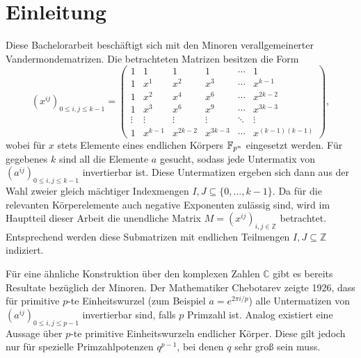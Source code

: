 \section{Einleitung}

Diese Bachelorarbeit beschäftigt sich mit den Minoren verallgemeinerter Vandermondematrizen. Die betrachteten Matrizen besitzen die Form \begin{equation*}
    \left( x^{ij} \right)_{0\leq i,j \leq k-1} = \begin{pmatrix}
        1     & 1    & 1    & 1    &\cdots& 1 \\
        1     & x^1  & x^2  & x^3  &\cdots& x^{k-1} \\
        1     & x^2  & x^4  & x^6  &\cdots& x^{2k-2} \\
        1     & x^3  & x^6  & x^9  &\cdots& x^{3k-3} \\
        \vdots&\vdots&\vdots&\vdots&\ddots&\vdots \\
        1     &x^{k-1}&x^{2k-2}&x^{3k-3}&\cdots&x^{(k-1)(k-1)}
    \end{pmatrix},
\end{equation*}
wobei für $x$ stets Elemente eines endlichen Körpers $\field{p}[n]$ eingesetzt werden. Für gegebenes $k$ sind all die Elemente $a$ gesucht, sodass jede Untermatix von $\left( a^{ij} \right)_{0\leq i,j \leq k-1}$ invertierbar ist. 
Diese Untermatizen ergeben sich dann aus der Wahl zweier gleich mächtiger Indexmengen $I,J \subseteq \{0, \dots, k-1\}$. Da für die relevanten Körperelemente auch negative Exponenten zulässig sind, wird im Hauptteil dieser Arbeit die unendliche Matrix $M = \left( x^{ij} \right)_{i,j \in \mathbb{Z}}$ betrachtet. Entsprechend werden diese Submatrizen mit endlichen Teilmengen $I,J \subseteq \mathbb{Z}$ indiziert.

\begin{comment}
    Ein Eintrag $x^{ij}$ kann als Monom aus dem Polynomring $\field{p}[n][X]$ verstanden werden. Aufgrund der Abgeschlossenheit der Polynomringe bilden die Minoren $\det M_{IJ}$ ebenfalls Polynome.
\end{comment}
    
Für eine ähnliche Konstruktion über den komplexen Zahlen $\mathbb{C}$ gibt es bereits Resultate bezüglich der Minoren. Der Mathematiker Chebotarev zeigte 1926, dass für primitive $p$-te Einheitswurzel (zum Beispiel $a=e^{2\pi i/p}$) alle Untermatizen von $\left( a^{ij} \right)_{0\leq i,j \leq p-1}$ invertierbar sind, falls $p$ Primzahl ist. \cite{CheboProof}
Analog existiert eine Aussage über $p$-te primitive Einheitswurzeln endlicher Körper. Diese gilt jedoch nur für spezielle Primzahlpotenzen $q^{p-1}$, bei denen $q$ sehr groß sein muss. \cite{CheboFiniteFields}
